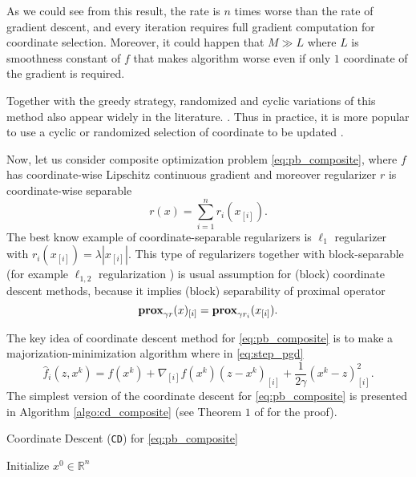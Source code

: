 As we could see from this result, the rate is $n$ times worse than the rate of gradient descent, and every iteration requires  full gradient computation for coordinate selection. Moreover, it could happen that $M\gg L$ where $L$ is  smoothness constant of $f$ that makes algorithm worse  even if only $1$ coordinate of the gradient is required.

Together with the greedy strategy, randomized and cyclic variations of this method also appear widely in the literature. . Thus in practice, it is more popular to use a cyclic or randomized selection of coordinate to be updated .

Now, let us consider composite optimization problem \eqref{eq:pb_composite}, where $f$ has coordinate-wise Lipschitz continuous gradient and moreover regularizer $r$ is coordinate-wise separable
$$
r(x) = \sum_{i=1}^nr_i(x_{[i]}).
$$
The best know example of coordinate-separable regularizers is $\ell_1$ regularizer with $r_i(x_{[i]}) = \lambda |x_{[i]}|$. This type of regularizers together with block-separable (for example $\ell_{1,2}$ regularization \cite{bach2012optimization}) is usual assumption for (block) coordinate descent methods, because it implies (block) separability of proximal operator
$$
\mathbf{prox}_{\gamma r}(x)_{[i]} = \mathbf{prox}_{\gamma r_i}(x_{[i]}).
$$

The key idea of coordinate descent method for \eqref{eq:pb_composite} is to make a majorization-minimization algorithm where in \eqref{eq:step_pgd} %
$$
\hat{f}_i(z, x^k) = f(x^k) + \nabla_{[i]} f(x^k) (z-x^k)_{[i]}+\frac{1}{2\gamma}(x^k-z)_{[i]}^2.
$$
The simplest version of the coordinate descent for \eqref{eq:pb_composite} is presented in Algorithm \ref{algo:cd_composite} (see Theorem $1$ of \cite{richtarik2012efficient} for the proof).

\begin{algorithm}
    \caption{Coordinate Descent (\texttt{CD}) for \eqref{eq:pb_composite}}
    \label{algo:cd_composite}
    \begin{algorithmic}
        \STATE Initialize $x^0\in\mathbb{R}^n$
        \ENDFOR
    \end{algorithmic}
\end{algorithm}

